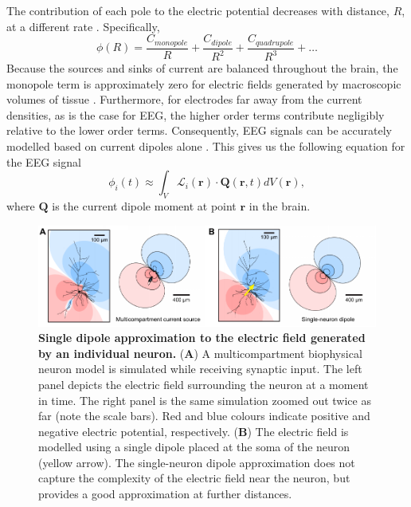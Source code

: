 The contribution of each pole to the electric potential decreases with distance, $R$, at a different rate \cite{Nunez2006}. Specifically,
\begin{equation*}
    \phi(R) = \frac{C_{monopole}}{R} + \frac{C_{dipole}}{R^2}  + \frac{C_{quadrupole}}{R^3}  + \dots
\end{equation*}
Because the sources and sinks of current are balanced throughout the brain, the monopole term is approximately zero for electric fields generated by macroscopic volumes of tissue \cite{Nunez2006}. Furthermore, for electrodes far away from the current densities, as is the case for EEG, the higher order terms contribute negligibly relative to the lower order terms. Consequently, EEG signals can be accurately modelled based on current dipoles alone \cite{Nunez2006,RevModPhys.65.413}. This gives us the following equation for the EEG signal \cite{RevModPhys.65.413}
\begin{equation} \label{eq:lead_solution}
    \phi_i(t) \approx \int_V \mathcal{L}_i(\bm{r}) \cdot \bm{Q}(\bm{r},t) dV(\bm{r})\mathrm{,}
\end{equation}
where $\bm{Q}$ is the current dipole moment at point $\bm{r}$ in the brain. 

\begin{figure}[b!]
    \centering
    \includegraphics[width=\textwidth]{Figures/chapter1/single_neuron_dipole.pdf}
    
    \caption[Single dipole approximation to the electric field]{\textbf{Single dipole approximation to the electric field generated by an individual neuron.} 
    (\textbf{A}) A multicompartment biophysical neuron model is simulated while receiving synaptic input. The left panel depicts the electric field surrounding the neuron at a moment in time. The right panel is the same simulation zoomed out twice as far (note the scale bars). Red and blue colours indicate positive and negative electric potential, respectively. (\textbf{B}) The electric field is modelled using a single dipole placed at the soma of the neuron (yellow arrow). The single-neuron dipole approximation does not capture the complexity of the electric field near the neuron, but provides a good approximation at further distances.} 
    \label{fig:single_dipole}
\end{figure}

